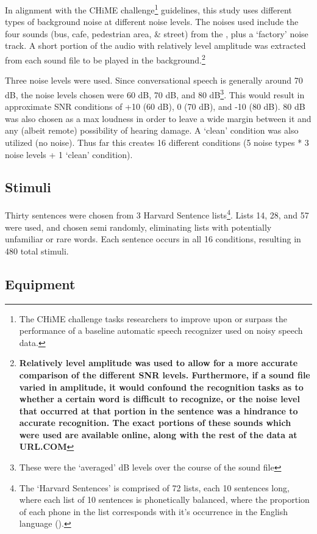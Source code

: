 \documentclass[dissertation,copyright]{uathesis}
\begin{document}
In alignment with the CHiME challenge\footnote{The CHiME challenge tasks researchers to improve upon or surpass the performance of a baseline automatic speech recognizer used on noisy speech data.} guidelines, this study uses different types of background noise at different noise levels.  The noises used include the four sounds (bus, cafe, pedestrian area, \& street) from the \cite{chime:16}, plus a `factory' noise track.  A short portion of the audio with relatively level amplitude was extracted from each sound file to be played in the background.\footnote{\textbf{Relatively level amplitude was used to allow for a more accurate comparison of the different SNR levels. Furthermore, if a sound file varied in amplitude, it would confound the recognition tasks as to whether a certain word is difficult to recognize, or the noise level that occurred at that portion in the sentence was a hindrance to accurate recognition. The exact portions of these sounds which were used are available online, along with the rest of the data at URL.COM}}

Three noise levels were used.  Since conversational speech is generally around 70 dB, the noise levels chosen were 60 dB, 70 dB, and 80 dB\footnote{These were the `averaged' dB levels over the course of the sound file}.  This would result in approximate SNR conditions of +10 (60 dB), 0 (70 dB), and -10 (80 dB).  80 dB was also chosen as a max loudness in order to leave a wide margin between it and any (albeit remote) possibility of hearing damage. A `clean' condition was also utilized (no noise).  Thus far this creates 16 different conditions (5 noise types * 3 noise levels + 1 `clean' condition).  

\subsection{Stimuli}
Thirty sentences were chosen from 3 Harvard Sentence lists\footnote{The `Harvard Sentences' is comprised of 72 lists, each 10 sentences long, where each list of 10 sentences is phonetically balanced, where the proportion of each phone in the list corresponds with it's occurrence in the English language (\cite{harvardSents}).}.  Lists 14, 28, and 57 were used, and chosen semi randomly, eliminating lists with potentially unfamiliar or rare words.  Each sentence occurs in all 16 conditions, resulting in 480 total stimuli.

  
\subsection{Equipment}
\end{document}
